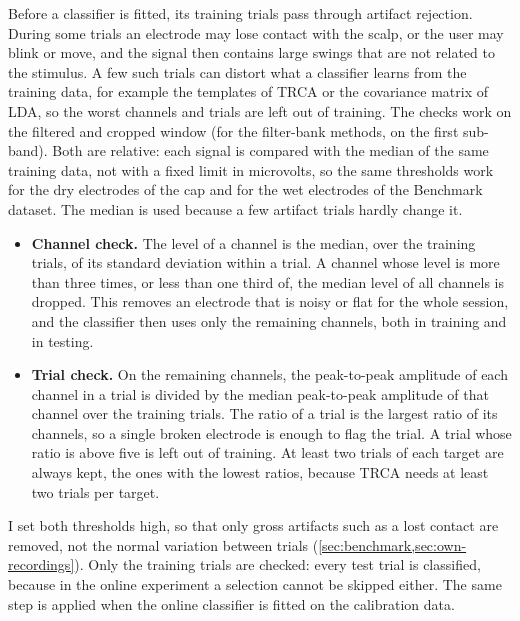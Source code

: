 Before a classifier is fitted, its training trials pass through artifact rejection. During
some trials an electrode may lose contact with the scalp, or the user may blink or move, and
the signal then contains large swings that are not related to the stimulus. A few such trials
can distort what a classifier learns from the training data, for example the templates of
\ac{TRCA} or the covariance matrix of \ac{LDA}, so the worst channels and trials are left out
of training. The checks work on the filtered and cropped window (for the filter-bank methods,
on the first sub-band). Both are relative: each signal is compared with the median of the
same training data, not with a fixed limit in microvolts, so the same thresholds work for the
dry electrodes of the cap and for the wet electrodes of the Benchmark dataset. The median is
used because a few artifact trials hardly change it.
\begin{itemize}
    \item \textbf{Channel check.} The level of a channel is the median, over the training
          trials, of its standard deviation within a trial. A channel whose level is more than
          three times, or less than one third of, the median level of all channels is dropped.
          This removes an electrode that is noisy or flat for the whole session, and the
          classifier then uses only the remaining channels, both in training and in testing.
    \item \textbf{Trial check.} On the remaining channels, the peak-to-peak amplitude of each
          channel in a trial is divided by the median peak-to-peak amplitude of that channel
          over the training trials. The ratio of a trial is the largest ratio of its channels,
          so a single broken electrode is enough to flag the trial. A trial whose ratio is
          above five is left out of training. At least two trials of each target are always
          kept, the ones with the lowest ratios, because \ac{TRCA} needs at least two trials
          per target.
\end{itemize}
I set both thresholds high, so that only gross artifacts such as a lost contact are removed,
not the normal variation between trials (\cref{sec:benchmark,sec:own-recordings}). Only the
training trials are checked: every test trial is classified, because in the online
experiment a selection cannot be skipped either. The same step is applied when the online
classifier is fitted on the calibration data.

